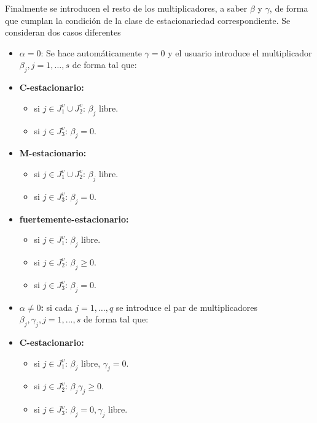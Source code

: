 Finalmente se introducen el resto de los multiplicadores,  a saber $\beta$ y $\gamma$,  de forma que cumplan la condici\'on de la clase de estacionariedad correspondiente. Se consideran dos casos diferentes
\begin{itemize}
\item {\textbf{ $\alpha=0$}}: Se hace autom\'aticamente $\gamma =0$   y el  usuario introduce el multiplicador $\beta_j, j=1,\ldots,s $ de forma tal que: 

\item[]\begin{center} {\textbf{ C-estacionario:}} \end{center}\begin{itemize}\item si $j\in J_1^v\cup J_2^v$: $\beta_j$ libre.\item si $j\in J_3^v$: $\beta_j=0$.\end{itemize}
\item[]\begin{center} {\textbf{ M-estacionario:}} \end{center}\begin{itemize}\item si $j\in J_1^v\cup J_2^v$: $\beta_j$ libre.\item si $j\in J_3^v$: $\beta_j=0$.\end{itemize}
\item[]\begin{center} {\textbf{ fuertemente-estacionario:}} \end{center}\begin{itemize}\item si $j\in J_1^v$: $\beta_j$ libre.\item si $j\in J_2^v$: $\beta_j\geq 0$.\item si $j\in J_3^v$: $\beta_j=0$.
\end{itemize}
\item  {\textbf{$\alpha\neq 0$:}} si cada $j=1,\ldots,q$ se introduce el par de multiplicadores $\beta_j, \gamma_j, j=1,\ldots,s$ de forma tal que: 
\item[]\begin{center} {\textbf{ C-estacionario:}} \end{center}\begin{itemize}\item si $j\in J_1^v$: $\beta_j$ libre, $\gamma_j=0$.\item si $j\in J_2^v$: $\beta_j\gamma_j\geq 0$.\item si $j\in J_3^v$: $\beta_j=0,\gamma_j$ libre.\end{itemize}

\end{itemize}
